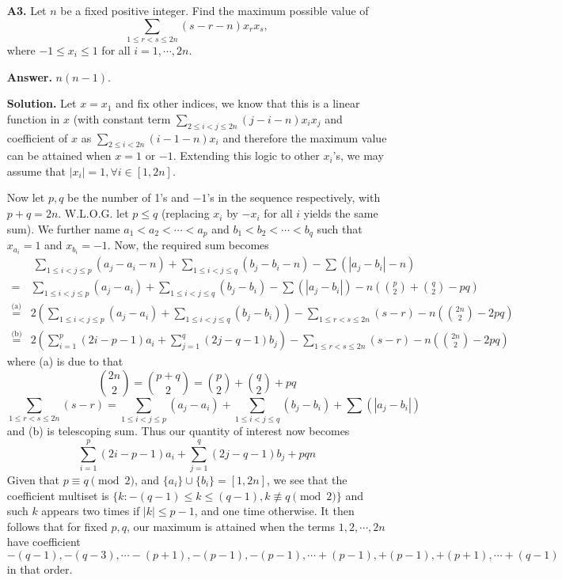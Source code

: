\documentclass[11pt,a4paper]{article}
\begin{document}
\begin{enumerate}
\item[\textbf{A3.}] Let $n$ be a fixed positive integer. Find the maximum possible value of \[ \sum_{1 \le r < s \le 2n} (s-r-n)x_rx_s, \]where $-1 \le x_i \le 1$ for all $i = 1, \cdots , 2n$.

\textbf{Answer.} $n(n - 1)$. 

\textbf{Solution.} Let $x=x_1$ and fix other indices, we know that this is a linear function in $x$ (with constant term $\displaystyle\sum_{2\le i<j\le 2n} (j-i-n)x_ix_j$ and coefficient of $x$ as $\displaystyle\sum_{2\le i< 2n} (i-1-n)x_i$ and therefore the maximum value can be attained when $x=1$ or $-1$. 
Extending this logic to other $x_i$'s, 
we may assume that $\mid x_i\mid =1, \forall i\in[1,2n]$.

Now let $p,q$ be the number of 1's and $-1$'s in the sequence respectively, with $p+q=2n$. 
W.L.O.G. let $p\le q$ (replacing $x_i$ by $-x_i$ for all $i$ yields the same sum). We further name $a_1< a_2<\cdots <a_p$ and $b_1< b_2<\cdots <b_q$ such that $x_{a_i}=1$ and $x_{b_i}=-1$. Now, the required sum becomes 
\begin{align*}
	&~\displaystyle\sum_{1\le i<j\le p} (a_j-a_i-n) + \displaystyle\sum_{1\le i<j\le q} (b_j-b_i-n)
	-\displaystyle\sum (|a_j-b_i|-n)
	\nonumber\\
	=&\displaystyle\sum_{1\le i<j\le p} (a_j-a_i) + \displaystyle\sum_{1\le i<j\le q} (b_j-b_i)
	-\displaystyle\sum (|a_j-b_i|)-n\left(\binom{p}{2}+\binom{q}{2}-pq\right)
	\nonumber\\
	\stackrel{\text{(a)}}{=}&2\left(\displaystyle\sum_{1\le i<j\le p} (a_j-a_i)
	+\displaystyle\sum_{1\le i<j\le q} (b_j-b_i)\right)
	-\displaystyle\sum_{1\le r< s\le 2n} (s-r)
	-n\left(\binom{2n}{2}-2pq\right)
	\nonumber\\
	\stackrel{\text{(b)}}{=}&2\left(\displaystyle\sum_{i=1}^{p} (2i-p-1)a_i
	+\displaystyle\sum_{j=1}^{q} (2j - q - 1)b_j \right)
	-\displaystyle\sum_{1\le r< s\le 2n} (s-r)
	-n\left(\binom{2n}{2}-2pq\right)
\end{align*}
  where (a) is due to that 
  \[
  \binom{2n}{2}
  =\binom{p+q}{2}
  =\binom{p}{2}+\binom{q}{2}+pq
  \]
  \[
  \displaystyle\sum_{1\le r< s\le 2n} (s-r)=\displaystyle\sum_{1\le i<j\le p} (a_j-a_i) + \displaystyle\sum_{1\le i<j\le q} (b_j-b_i)+ \displaystyle\sum (|a_j-b_i|)
  \]
  and (b) is telescoping sum. 
  Thus our quantity of interest now becomes 
  \[
  \displaystyle\sum_{i=1}^{p} (2i-p-1)a_i
  +\displaystyle\sum_{j=1}^{q} (2j - q - 1)b_j 
  +pqn
  \]
  Given that $p\equiv q\pmod{2}$, and $\{a_i\}\cup \{b_i\}=[1, 2n]$, 
  we see that the coefficient multiset is $\{k: -(q-1)\le k\le (q-1), k\not\equiv q\pmod{2}\}$ and such $k$ appears two times if $|k|\le p-1$, and one time otherwise. 
  It then follows that for fixed $p, q$, our maximum is attained when the terms $1,2,\cdots , 2n$ have coefficient $-(q-1),-(q-3),\cdots -(p+1), -(p-1),-(p-1),\cdots +(p-1),+(p-1), +(p+1),\cdots +(q-1)$ in that order. 


\end{enumerate}
\end{document}
